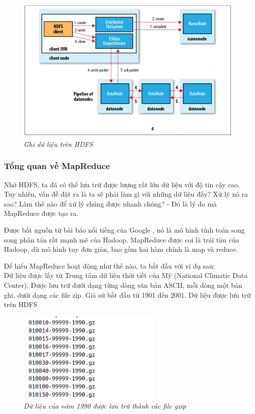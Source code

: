 \documentclass[12pt]{report}
\begin{document}
\begin{itemize}
\begin{figure}[H]
\centering
\includegraphics[width=\textwidth]{write.png}
\caption{\it Ghi dữ liệu trên HDFS \cite{write}}
\end{figure}
\end{itemize}

\subsubsection{Tổng quan về MapReduce}
Nhờ HDFS, ta đã có thể lưu trữ được lượng rất lớn dữ liệu với độ tin cậy cao. Tuy nhiên, vấn đề đặt ra là ta sẽ phải làm gì với những dữ liệu đấy? Xử lý nó ra sao? Làm thế nào để xử lý chúng được nhanh chóng? - Đó là lý do mà MapReduce được tạo ra.

Được bắt nguồn từ bài báo nổi tiếng của Google \cite{mapreduce_google}, nó là mô hình tính toán song song phân tán rất mạnh mẽ của Hadoop. MapReduce được coi là trái tim của Hadoop, dù mô hình tuy đơn giản, bao gồm hai hàm chính là map và reduce. 

Để hiểu MapReduce hoạt động như thế nào, ta bắt đầu với ví dụ sau: \\
Dữ liệu được lấy từ Trung tâm dữ liệu thời tiết của Mỹ (National Climatic Data Center). Được lưu trữ dưới dạng từng dòng văn bản ASCII, mỗi dòng một bản ghi, dưới dạng các file zip. Giả sử bắt đầu từ 1901 đến 2001. Dữ liệu được lưu trữ trên HDFS

\begin{figure} [H]
\centering
\includegraphics[width=7cm]{data.png}
\caption{\it Dữ liệu của năm 1990 được lưu trữ thành các file gzip}
\end{figure}
\end{document}
